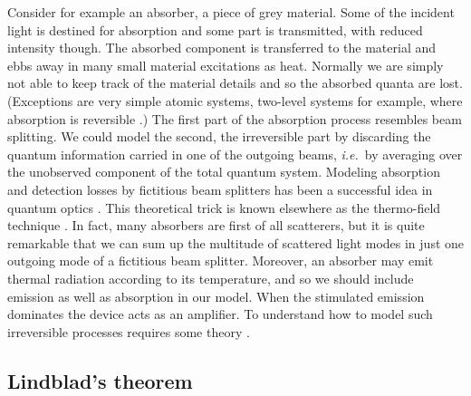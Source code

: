 \documentclass[12pt,amsmath,amssymb]{article}
\numberwithin{equation}{section}
\begin{document}
Consider for example an absorber, a piece of grey material. Some
of the incident light is destined for absorption and some part is
transmitted, with reduced intensity though. The absorbed component
is transferred to the material and ebbs away in many small
material excitations as heat. Normally we are simply not able to
keep track of the material details and so the absorbed quanta are
lost. (Exceptions are very simple atomic systems, two-level
systems for example, where absorption is reversible
\cite{JC,Paul0,ShoreKnight}.) The first part of the absorption process
resembles beam splitting. We could model the second, the
irreversible part by discarding the quantum information carried
in one of the outgoing beams, {\it i.e.}\ by averaging over the
unobserved component of the total quantum system. Modeling
absorption and detection losses by fictitious beam splitters has
been a successful idea in quantum optics
\cite{Fearn,JIL,Knoelletal,LPs,PaulReview,YuenShapiro}.
This theoretical trick is known elsewhere
as the thermo-field technique \cite{Umezawa}. In fact, many
absorbers are first of all scatterers, but it is quite remarkable
that we can sum up the multitude of scattered light modes in just
one outgoing mode of a fictitious beam splitter. Moreover, an
absorber may emit thermal radiation according to its temperature,
and so we should include emission as well as absorption in our
model. When the stimulated emission dominates the device acts as
an amplifier. To understand how to model such irreversible
processes requires some theory
\cite{BP,Carmichael,Gardiner,GardinerZoller,Lindblad}.

\subsection{Lindblad's theorem}
\end{document}
